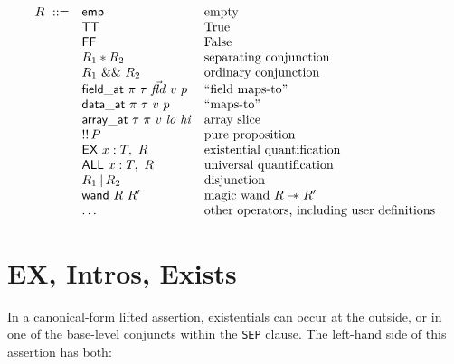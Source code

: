\documentclass[12pt,fleqn,openany,oneside,showtrims]{memoir}
\begin{document}
\[\begin{array}{lll}
R~::=&
\mathsf{emp} & \mbox{empty} \\
&\mathsf{TT} & \mbox{True} \\
&\mathsf{FF} & \mbox{False} \\
& R_1 * R_2 & \mbox{separating conjunction}\\
& R_1 ~\mathsf{\&\&}~ R_2 & \mbox{ordinary conjunction}\\
& \mathsf{field\_at}~\pi~\tau~\vec{\mathit{fld}}~v~p&
     \mbox{``field maps-to''} \\
& \mathsf{data\_at}~\pi~\tau~v~p& \mbox{``maps-to''} \\
& \mathsf{array\_at}~\tau~\pi~v~\mathit{lo}~\mathit{hi} & \mbox{array slice} \\
& \mathsf{!!}\,P & \mbox{pure proposition} \\
& \mathsf{EX}~x:T,~R & \mbox{existential quantification} \\
& \mathsf{ALL}~x:T,~R & \mbox{universal quantification} \\
& R_1 \mathsf{\|}\, R_2 & \mbox{disjunction}\\
& \mathsf{wand} ~R~ R' & \mbox{magic wand}~R \mathrel{-\hspace{-.7ex}*} R'\\
& \ldots & \mbox{other operators, including user definitions}
\end{array}\]

\chapter{\upshape\textsf{EX, Intros, Exists}}
\label{refcard:EX}
\label{refcard:intros}

In a canonical-form lifted assertion, existentials can occur
at the outside, or in one of the base-level conjuncts within the
\lstinline{SEP} clause.  The left-hand side of this assertion has both:
\end{document}
